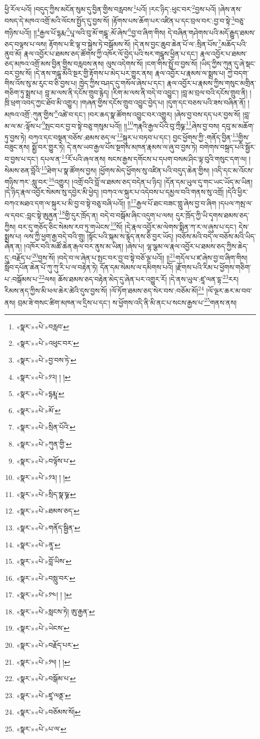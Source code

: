 ཕྱི་རོལ་པའོ། །བདུད་ཀྱིས་མངོན་སུམ་དུ་བྱིན་གྱིས་བརླབས་\footnote{«སྣར་»«པེ་»བརླབ་}པའོ། །རང་ཉིད་:ཕུང་བར་\footnote{«སྣར་»«པེ་»འཕུང་བར་}བྱས་པའོ། །ཞེས་ནས་བསད་དེ་མཁའ་འགྲོ་མའི་ལོངས་སྤྱོད་དུ་བྱས་སོ། །རྟོགས་པས་ཆོག་པར་འཛིན་པ་དང་བྲལ་བར་:བྱ་བ་སྟེ་\footnote{«སྣར་»«པེ་»བྱ་བས་ཏེ་}བཅུ་གཉིས་པའོ།། །།\footnote{«སྣར་»«པེ་»༡༢། ། །}རྒྱལ་པོ་དྷརྨ་\footnote{«སྣར་»«པེ་»དྷརྨཱ་}པཱ་ལའི་བུ་མོ་གངྒཱ་:མོ་ཞེས་\footnote{«སྣར་»«པེ་»མོ་}བྱ་བ་ཞིག་གིས། དེ་བཞིན་གཤེགས་པའི་མདོ་རྒྱུད་ཐམས་ཅད་བལྟས་པ་ལས། རྟོགས་པ་ཇི་ལྟ་བ་སྐྱེས་ཏེ་བསྒོམས་སོ། །དེ་ནས་བྱང་ཆུབ་ཆེན་པོ་ལ་:སྲིན་པོས་\footnote{«སྣར་»«པེ་»སྲིན་པོའི་}མཆོད་པའི་ནུབ་མོ། རྣལ་འབྱོར་པ་ཐམས་ཅད་ཚོགས་ཀྱི་འཁོར་ལོ་བྱེད་པའི་སར་གངྒཱས་ཕྱིན་པ་དང་། རྣལ་འབྱོར་པ་ཐམས་ཅད་མཁའ་འགྲོ་མས་བྱིན་གྱིས་བརླབས་ནས། ལུས་འདེགས་སོ། །ངག་གིས་སྤྲོ་བ་བྱས་སོ། །ཡིད་ཀྱིས་ཀུན་དུ་ཞེ་སྡང་བར་བྱས་སོ། །དེ་ནས་གངྒཱ་མོའི་སྔར་གྱི་རྟོགས་པ་མེད་པར་གྱུར་ནས། རྣལ་འབྱོར་པ་རྣམས་ལ་སྨྲས་པ། ཀྱེ་བདག་གིས་འོས་སུ་མ་རུང་བ་ཅི་བྱས་པ། ཁྱེད་ཀྱིས་བཤད་དུ་གསོལ་ཞེས་པ་དང་། རྣལ་འབྱོར་པ་རྣམས་ཀྱིས་གསུང་མགྲིན་གཅིག་ཏུ་སྨྲས་པ། བླ་མ་ལས་ནི་དངོས་གྲུབ་རྙེད། །རིག་མ་ལས་ནི་བདེ་བ་འབྱུང་། །བླ་མ་བྲལ་བའི་དངོས་གྲུབ་ནི། །ཁྲི་ཕྲག་འབད་ཀྱང་ཐོབ་མི་འགྱུར། །གཞན་གྱིས་དངོས་གྲུབ་འབྱུང་བྱེད་པ། །དུག་དང་བཅས་པའི་ཟས་བཞིན་ནོ། །མཁའ་འགྲོ་:ཀུན་གྱིས་\footnote{«སྣར་»«པེ་»ཀུན་གྱི་}འཚེ་བ་དང་། །བར་ཆད་སྣ་ཚོགས་འབྱུང་བར་འགྱུར། །ཞེས་བྱ་བས་དད་པར་བྱས་སོ། །བླ་མ་ལ་མ་:ལྟོས་པ་\footnote{«སྣར་»«པེ་»བལྟོས་པ་}སྤང་བར་བྱ་བ་སྟེ་བཅུ་གསུམ་པའོ།། །།\footnote{«སྣར་»«པེ་»༡༣། ། །}ཀརྣའི་རྒྱལ་པོའི་བུ་ཀྲྀཥྞ་\footnote{«སྣར་»«པེ་»སྲིད་སྣ་ཥྞ་}ཞེས་བྱ་བས། དབུ་མ་མཆོག་ཏུ་བྱས་ཏེ། བཀའ་དང་བསྟན་བཅོས་:ཐམས་ཅད་ལ་\footnote{«སྣར་»«པེ་»ཐམས་ཅད་}སྐུར་པ་བཏབ་པ་དང་། བྱང་ཕྱོགས་ཀྱི་:གནོད་བྱིན་\footnote{«སྣར་»«པེ་»གནོད་སྦྱིན་}གྱིས་བཟུང་ནས། སྨྱོ་བར་གྱུར་ཏེ། དེ་ནས་ཡབ་རྒྱལ་པོས་སྔགས་མཁན་རྣམས་ལ་ཞུ་བ་བྱས་ཏེ། བགེགས་བསྐྲད་པའི་སྦྱོར་བ་བྱས་པ་དང་། དཔལ་ན་\footnote{«སྣར་»«པེ་»ནཱ་}རོ་པའི་ཞལ་ནས། སངས་རྒྱས་དགོངས་པ་དཔག་བསམ་ཤིང་ལྟ་བུའི་གསུང་དག་ལ། །སེམས་ཅན་བློའི་\footnote{«སྣར་»«པེ་»བློ་ཡིས་}ཐེག་པ་སྣ་ཚོགས་བྱས། །ཕྱོགས་མེད་ཕྱོགས་སུ་འཛིན་པའི་བདུད་ཆེན་གྱིས། །འདི་དང་མ་འོངས་གཉིས་ཀར་:སླུ་བར་\footnote{«སྣར་»«པེ་»བསླུ་བར་}འགྱུར། །འགྲོ་བའི་བློ་ལ་ཐམས་ཅད་བདེན་པ་ཉིད། །དོན་དམ་ཡུལ་དུ་གང་ཡང་ཡོད་མ་ཡིན། །དེ་ཉིད་རྣལ་འབྱོར་སེམས་སུ་དབྱེར་མི་ཕྱེད། །བཀའ་ལ་སྐུར་པ་འདེབས་པ་དམྱལ་བའི་གནས་སུ་འགྲོ། །དེའི་ཕྱིར་བཀའ་མཐའ་དག་ལ་སྐུར་པ་མི་བྱ་བ་སྟེ་བཅུ་བཞི་པའོ།། །།\footnote{«སྣར་»«པེ་»༡༤། ། །}རྒྱལ་པོ་ཐང་བཟང་གླུ་ཞེས་བྱ་བ་ཞིག །དཔལ་ཀམྤ་ལ་ལ་དབང་:བླང་སྟེ་ཨུནྱན་\footnote{«སྣར་»«པེ་»སླངས་ཏེ། ཨུ་རྒྱན་}གྱི་དུར་ཁྲོད་ན། བདེ་བ་བསྒོམ་ཞིང་འདུག་པ་ལས། དུར་ཁྲོད་ཀྱི་ཡི་དྭགས་ཐམས་ཅད་ཀྱིས། བར་དུ་གཅོད་ཅིང་སེམས་རབ་ཏུ་གཡེངས་\footnote{«སྣར་»«པེ་»ཡེངས་}སོ། །དེ་རྣལ་འབྱོར་མ་ལེགས་སྨིན་ཀ་ར་ལ་ཞུས་པ་དང་། དེས་སྨྲས་པ། ལས་ཀྱི་ཕྱག་རྒྱ་བདེ་བའི་གྲུ། །སྟོང་པའི་སྐམ་ས་རྙེད་ནས་ཅི་བྱར་ཡོད། །བཅོས་མའི་བདེ་ལ་བཅོས་མའི་ཡིད་ཞེན་ན། །འཁོར་བའི་མཚོ་ཆེན་རྒལ་བར་ནུས་མ་ཡིན། །ཞེས་པ། ལྷ་ལྕམ་ལ་རྣལ་འབྱོར་པ་ཐམས་ཅད་ཀྱིས་ཆེད་དུ་:བརྗོད་པ་\footnote{«སྣར་»«པེ་»བརྗོད་པར་}བྱས་སོ། །བདེ་བ་ལ་ཞེན་པ་སྤང་བར་བྱ་བ་སྟེ་བཅོ་ལྔ་པའོ།། །།\footnote{«སྣར་»«པེ་»༡༥། ། །}གདོལ་པ་ཛ་ཞེས་བྱ་བ་ཞིག་གིས། སློབ་དཔོན་ཆེན་པོ་ཀུ་ཀུ་རི་པ་ལ་བརྟེན་ཏེ། དོན་དམ་སེམས་ལ་དམིགས་པའོ། །རྫོགས་པའི་རིམ་པ་ཕྱོགས་གཅིག་པ་:བསྒོམས་པ་\footnote{«སྣར་»«པེ་»བསྒོམ་པ་}ལས། ཆོས་ཐམས་ཅད་བརྟེན་མེད་དུ་ཞེན་པར་འགྱུར་རོ། །དེ་ནས་ཡུལ་:ཛཱ་ལན་དྷ་\footnote{«སྣར་»«པེ་»ཛཱ་ལནྡ་}རར། རིམས་ནད་ཀྱིས་མི་ཕལ་ཆེར་ཚེའི་དུས་བྱས་སོ། །ལོ་ཏོག་ཐམས་ཅད་སེར་བས་:བཅོམ་མོ།\footnote{«སྣར་»«པེ་»བཅོམས་སོ།} །ལོ་ལྔར་ཆར་མ་བབ་ནས། བྲམ་ཟེ་གསང་ཚིག་མཁན་ལ་དྲིས་པ་དང་། ས་ཕྱོགས་འདི་ནི་མི་ནང་པ་སངས་རྒྱས་པ་\footnote{«སྣར་»«པེ་»པ་ལ་}གནས་ནས། 